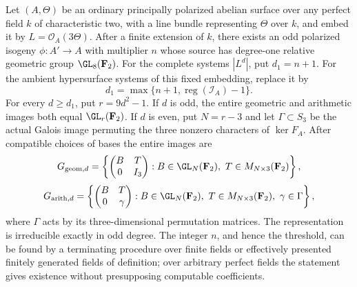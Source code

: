 \begin{theorem}
\label{thm:ordinary-ppav-eventual-full}
Let $(A,\Theta)$ be an ordinary principally polarized abelian surface over
any perfect field $k$ of characteristic two, with a line bundle representing
$\Theta$ over $k$, and embed it by $L=\mathcal O_A(3\Theta)$.
After a finite extension of $k$, there exists an odd polarized isogeny
$\phi:A'\to A$ with multiplier $n$ whose source has degree-one relative
geometric group $\GL_8(\mathbf F_2)$.
For the complete systems $|L^d|$, put $d_1=n+1$.
For the ambient hypersurface systems of this fixed embedding, replace it by
\[
           d_1=\max\{n+1,\operatorname{reg}(\mathcal I_A)-1\}.
\]
For every $d\ge d_1$, put $r=9d^2-1$. If $d$ is odd, the entire geometric
and arithmetic images both equal $\GL_r(\mathbf F_2)$.
If $d$ is even, put $N=r-3$ and let $\Gamma\subset S_3$ be the actual
Galois image permuting the three nonzero characters of $\ker F_A$.
After compatible choices of bases the entire images are
\[
 G_{{\rm geom},d}=
 \left\{\begin{pmatrix}B&T\\0&I_3\end{pmatrix}:
 B\in\GL_N(\mathbf F_2),\ T\in M_{N\times3}(\mathbf F_2)\right\},
\]
\[
 G_{{\rm arith},d}=
 \left\{\begin{pmatrix}B&T\\0&\gamma\end{pmatrix}:
 B\in\GL_N(\mathbf F_2),\ T\in M_{N\times3}(\mathbf F_2),\
 \gamma\in\Gamma\right\},
\]
where $\Gamma$ acts by its three-dimensional permutation matrices.
The representation is irreducible exactly in odd degree.
The integer $n$, and hence the threshold, can be found by a terminating
procedure over finite fields or effectively presented finitely generated
fields of definition; over arbitrary perfect fields the statement gives
existence without presupposing computable coefficients.
\end{theorem}
